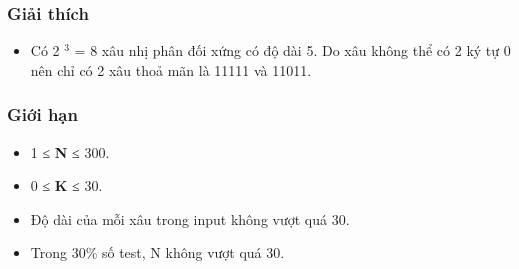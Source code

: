 \subsubsection{Giải thích}
\begin{itemize}
	\item Có 2 $^ 3 $ = 8 xâu nhị phân đối xứng có độ dài 5. Do xâu không thể có 2 ký tự 0 nên chỉ có 2 xâu thoả mãn là 11111 và 11011.
\end{itemize}

\subsubsection{Giới hạn}
\begin{itemize}
	\item 1 ≤ \textbf{ N } ≤ 300.
	\item 0 ≤ \textbf{ K } ≤ 30.
	\item Độ dài của mỗi xâu trong input không vượt quá 30.
	\item Trong 30\% số test, N không vượt quá 30.
\end{itemize}